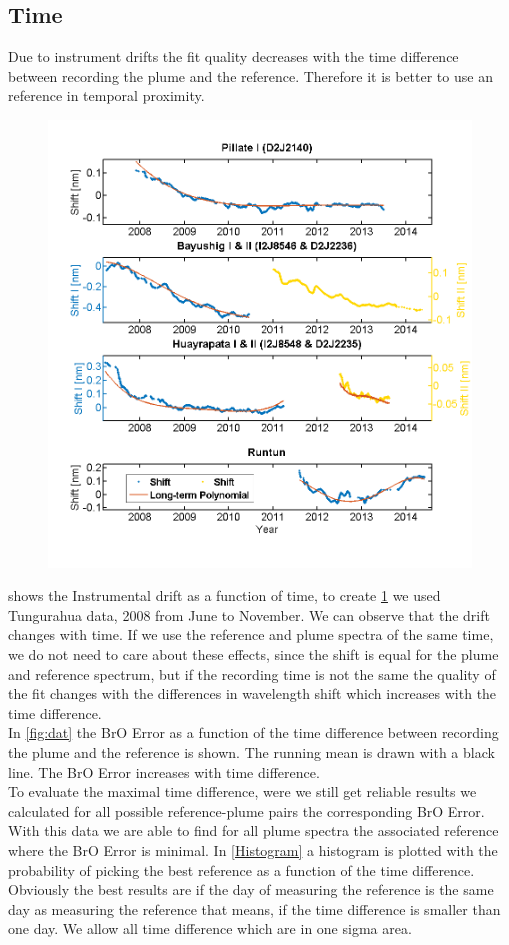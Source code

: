 \documentclass  [
  paper    = a4,
  BCOR     = 10mm,
  twoside,
  fontsize = 12pt,
  fleqn,
  toc      = bibnumbered,
  toc      = listofnumbered,
  numbers  = noendperiod,
  headings = normal,
  listof   = leveldown,
  version  = 3.03
]                                       {scrreprt}
\begin{document}
	\subsection{Time}
	Due to instrument drifts the fit quality decreases with the time difference between recording the plume and the reference. Therefore it is better to use an reference in temporal proximity.\\
	\begin{figure}[h]
		\centering
		\includegraphics[width=0.7\linewidth]{Bilder/Simon/Bilder_Tung/Drift_Komplett_NEW}
		\caption{}
		\label{fig:driftkomplettnew}
	\end{figure}
	 shows the Instrumental drift as a function of time, to create \cref{fig:driftkomplettnew} we used Tungurahua data, 2008 from June to November. We can observe that the drift changes with time. If we use the reference and plume spectra of the same time, we do not need to care about these effects, since the shift is equal for the plume and reference spectrum, but if the recording time is not the same the quality of the fit changes with the differences in wavelength shift which increases with the time difference.\\
	In \cref{fig:dat} the BrO Error as a function of the time difference between recording the plume and the reference is shown. The running mean is drawn with a black line. The BrO Error increases with time difference.\\
	To evaluate the maximal time difference, were we still get reliable results we calculated for all possible reference-plume pairs the corresponding BrO Error. With this data we are able to find for all plume spectra the associated reference where the BrO Error is minimal. In \cref{Histogram} a histogram is plotted with the probability of picking the best reference as a function of the time difference. Obviously the best results are if the day of measuring the reference is the same day as measuring the reference that means, if the time difference is smaller than one day. We allow all time difference which are in one sigma area. 
	
\end{document}
